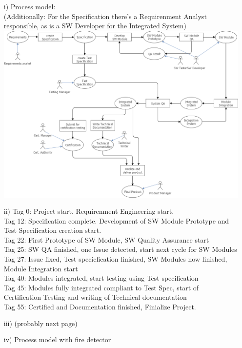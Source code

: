 \documentclass{scrartcl}
\begin{document}
\begin{itemize}
    \item[i)] Process model: \\
        (Additionally: For the Specification there's a Requirenment Analyst responsible, as is a SW Developer for the Integrated System) \\
    	\includegraphics[width=\textwidth]{swt_2_1.png}
    \item[ii)]
        Tag 0: Project start. Requirenment Engineering start. \\
        Tag 12: Specification complete. Development of SW Module Prototype and Test Specification creation start. \\
        Tag 22: First Prototype of SW Module, SW Quality Assurance start \\
        Tag 25: SW QA finished, one Issue detected, start next cycle for SW Modules \\
        Tag 27: Issue fixed, Test specicfication finished, SW Modules now finished, Module Integration start \\
        Tag 40: Modules integrated, start testing using Test specification \\
        Tag 45: Modules fully integrated compliant to Test Spec, start of Certification Testing and writing of Technical documentation \\
        Tag 55: Certified and Documentation finished, Finialize Project. \\
    \item[iii)] (probably next page) \\
        
    \item[iv)] Process model with fire detector \\

\end{itemize}
\end{document}
